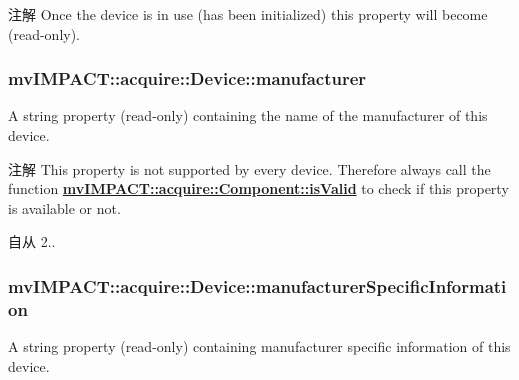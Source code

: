 \begin{DoxyNote}{注解}
Once the device is in use (has been initialized) this property will become {\bfseries }(read-\/only). 
\end{DoxyNote}
\hypertarget{classmv_i_m_p_a_c_t_1_1acquire_1_1_device_aa3ee34abadfd5192050fb3281282190d}{
\subsubsection[{manufacturer}]{ mv\+I\+M\+P\+A\+C\+T\+::acquire\+::\+Device\+::manufacturer}}\label{classmv_i_m_p_a_c_t_1_1acquire_1_1_device_aa3ee34abadfd5192050fb3281282190d}


A string property {\bfseries }(read-\/only) containing the name of the manufacturer of this device. 

\begin{DoxyNote}{注解}
This property is not supported by every device. Therefore always call the function {\bfseries \hyperlink{classmv_i_m_p_a_c_t_1_1acquire_1_1_component_ac51e55e7e046101f3c6119d84123abd5}{mv\+I\+M\+P\+A\+C\+T\+::acquire\+::\+Component\+::is\+Valid}} to check if this property is available or not.
\end{DoxyNote}
\begin{DoxySince}{自从}
2.. 
\end{DoxySince}
\hypertarget{classmv_i_m_p_a_c_t_1_1acquire_1_1_device_ad10fa0ebc71bae2bf872fcbed6d34701}{
\subsubsection[{manufacturer\+Specific\+Information}]{ mv\+I\+M\+P\+A\+C\+T\+::acquire\+::\+Device\+::manufacturer\+Specific\+Information}}\label{classmv_i_m_p_a_c_t_1_1acquire_1_1_device_ad10fa0ebc71bae2bf872fcbed6d34701}


A string property {\bfseries }(read-\/only) containing manufacturer specific information of this device. 

